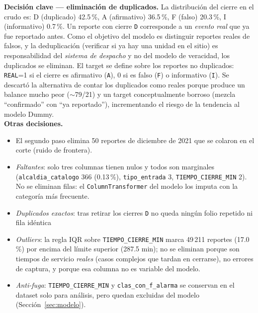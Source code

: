 \documentclass[11pt,letterpaper]{article}
\begin{document}
\textbf{Decisión clave — eliminación de duplicados.} La distribución del
cierre en el crudo es: D (duplicado) 42.5\,\%, A (afirmativo) 36.5\,\%, F
(falso) 20.3\,\%, I (informativo) 0.7\,\%. Un reporte con cierre \texttt{D}
corresponde a un \emph{evento real} que ya fue reportado antes. Como el
objetivo del modelo es distinguir reportes reales de falsos, y la
deduplicación (verificar si ya hay una unidad en el sitio) es responsabilidad
del \emph{sistema de despacho} y no del modelo de veracidad, los duplicados se
eliminan. El target se define sobre los reportes no duplicados:
\texttt{REAL}=1 si el cierre es afirmativo (\texttt{A}), 0 si es falso
(\texttt{F}) o informativo (\texttt{I}). Se descartó la alternativa de contar
los duplicados como reales porque produce un balance mucho peor
($\sim$79/21) y un target conceptualmente borroso (mezcla ``confirmado'' con
``ya reportado''), incrementando el riesgo de la tendencia al modelo Dummy. \\

\textbf{Otras decisiones.}

\begin{itemize}
  \item El segundo paso elimina 50 reportes de diciembre de 2021 que se colaron en el corte (ruido de frontera).
  \item \emph{Faltantes}: solo tres columnas tienen nulos y todos son marginales
  (\texttt{alcaldia\_catalogo} 366 (0.13\,\%), \texttt{tipo\_entrada} 3,
  \texttt{TIEMPO\_CIERRE\_MIN} 2). No se eliminan filas: el
  \texttt{ColumnTransformer} del modelo los imputa con la categoría más
  frecuente.
  \item \emph{Duplicados exactos}: tras retirar los cierres \texttt{D} no queda ningún folio repetido ni fila idéntica
  \item \emph{Outliers}: la regla IQR sobre \texttt{TIEMPO\_CIERRE\_MIN} marca 49\,211
reportes (17.0\,\%) por encima del límite superior (287.5 min); no se eliminan
porque son tiempos de servicio \emph{reales} (casos complejos que tardan en
cerrarse), no errores de captura, y porque esa columna no es variable del
modelo.

  \item \emph{Anti-fuga}: \texttt{TIEMPO\_CIERRE\_MIN} y
\texttt{clas\_con\_f\_alarma} se conservan en el dataset solo para análisis, pero
quedan excluidas del modelo (Sección~\ref{sec:modelo}).
  
\end{itemize}

\end{document}

